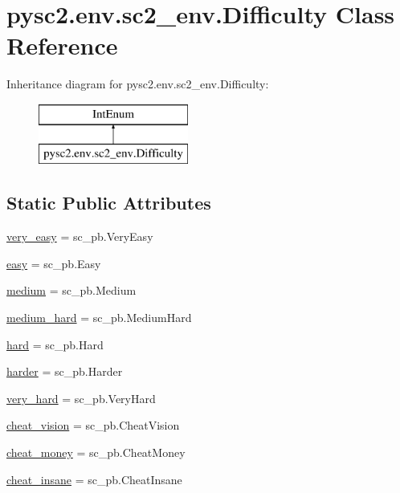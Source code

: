 \hypertarget{classpysc2_1_1env_1_1sc2__env_1_1_difficulty}{}\section{pysc2.\+env.\+sc2\+\_\+env.\+Difficulty Class Reference}
\label{classpysc2_1_1env_1_1sc2__env_1_1_difficulty}
Inheritance diagram for pysc2.\+env.\+sc2\+\_\+env.\+Difficulty\+:\begin{figure}[H]
\begin{center}
\leavevmode
\includegraphics[height=2.000000cm]{classpysc2_1_1env_1_1sc2__env_1_1_difficulty}
\end{center}
\end{figure}
\subsection*{Static Public Attributes}
\begin{DoxyCompactItemize}
\item 
\mbox{\hyperlink{classpysc2_1_1env_1_1sc2__env_1_1_difficulty_ad18cddab1aeb3e4bfa8e5d053db9cc7a}{very\+\_\+easy}} = sc\+\_\+pb.\+Very\+Easy
\item 
\mbox{\hyperlink{classpysc2_1_1env_1_1sc2__env_1_1_difficulty_a91ae2b79485f42d369c2188187818e85}{easy}} = sc\+\_\+pb.\+Easy
\item 
\mbox{\hyperlink{classpysc2_1_1env_1_1sc2__env_1_1_difficulty_a706a666a3a2e916bfefdcd0dd57ff6ae}{medium}} = sc\+\_\+pb.\+Medium
\item 
\mbox{\hyperlink{classpysc2_1_1env_1_1sc2__env_1_1_difficulty_af78449b9e9abe19205a4b318265da564}{medium\+\_\+hard}} = sc\+\_\+pb.\+Medium\+Hard
\item 
\mbox{\hyperlink{classpysc2_1_1env_1_1sc2__env_1_1_difficulty_abaa3239dd900a199541dfe84245615bc}{hard}} = sc\+\_\+pb.\+Hard
\item 
\mbox{\hyperlink{classpysc2_1_1env_1_1sc2__env_1_1_difficulty_a5993c03de5b86b5da9d6c2c651df1132}{harder}} = sc\+\_\+pb.\+Harder
\item 
\mbox{\hyperlink{classpysc2_1_1env_1_1sc2__env_1_1_difficulty_a9d4a5c2e15f804b56949a6bc72c973b1}{very\+\_\+hard}} = sc\+\_\+pb.\+Very\+Hard
\item 
\mbox{\hyperlink{classpysc2_1_1env_1_1sc2__env_1_1_difficulty_a8e11dd0c16f631023aec02f99d414a12}{cheat\+\_\+vision}} = sc\+\_\+pb.\+Cheat\+Vision
\item 
\mbox{\hyperlink{classpysc2_1_1env_1_1sc2__env_1_1_difficulty_a982b1d88aef08815c846126ce7319be0}{cheat\+\_\+money}} = sc\+\_\+pb.\+Cheat\+Money
\item 
\mbox{\hyperlink{classpysc2_1_1env_1_1sc2__env_1_1_difficulty_a9e46cdfe4b569bccdfb8cea96e95d1a4}{cheat\+\_\+insane}} = sc\+\_\+pb.\+Cheat\+Insane
\end{DoxyCompactItemize}


